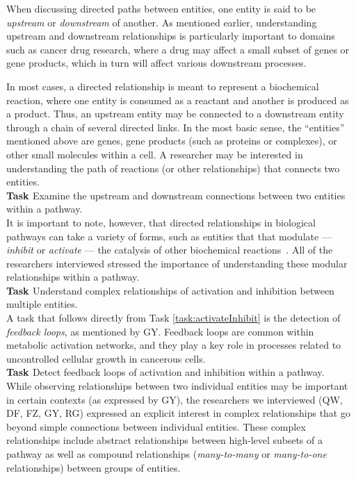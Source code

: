 \documentclass[review,journal]{vgtc}         %
\newcounter{task}
\newcommand*{\tasklabel}[1]{\refstepcounter{task}\thetask\label{#1}}
\begin{document}
When discussing directed paths between entities, one entity is said to be \emph{upstream} or \emph{downstream} of another. As mentioned earlier, understanding upstream and downstream relationships is particularly important to domains such as cancer drug research, where a drug may affect a small subset of genes or gene products, which in turn will affect various downstream processes.

In most cases, a directed relationship is meant to represent a biochemical reaction, where one entity is consumed as a reactant and another is produced as a product. Thus, an upstream entity may be connected to a downstream entity through a chain of several directed links. In the most basic sense, the ``entities'' mentioned above are genes, gene products (such as proteins or complexes), or other small molecules within a cell. A researcher may be interested in understanding the path of reactions (or other relationships) that connects two entities.
\ \\

\textbf{Task \tasklabel{task:upstreamDownstreamEntities}} Examine the upstream and downstream connections between two entities within a pathway.
\ \\

It is important to note, however, that directed relationships in biological pathways can take a variety of forms, such as entities that that modulate --- \emph{inhibit} or \emph{activate} --- the catalysis of other biochemical reactions~\cite{demir2010biopax}. All of the researchers interviewed stressed the importance of understanding these modular relationships within a pathway.
\ \\

\textbf{Task \tasklabel{task:activateInhibit}} Understand complex relationships of activation and inhibition between multiple entities.
\ \\

A task that follows directly from Task \ref{task:activateInhibit} is the detection of \emph{feedback loops}, as mentioned by GY. Feedback loops are common within metabolic activation networks, and they play a key role in processes related to uncontrolled cellular growth in cancerous cells.
\ \\

\textbf{Task \tasklabel{task:feedback}} Detect feedback loops of activation and inhibition within a pathway.
\ \\

While observing relationships between two individual entities may be important in certain contexts (as expressed by GY), the researchers we interviewed (QW, DF, FZ, GY, RG) expressed an explicit interest in complex relationships that go beyond simple connections between individual entities. These complex relationships include abstract relationships between high-level subsets of a pathway as well as compound relationships (\emph{many-to-many} or \emph{many-to-one} relationships) between groups of entities.
\end{document}

